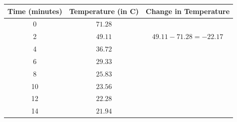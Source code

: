 \documentclass[convert]{standalone}
\begin{document}
\begin{tabular}{|c|c|c|}
	\hline
	Time (minutes) & Temperature (in \textdegree C) & Change in Temperature    \\ \hline
	0              & $71.28$                                         & \cellcolor[HTML]{C0C0C0} \\ \hline
	2              & $49.11$                                         & $49.11-71.28=-22.17$                    \\ \hline
	4              & $36.72$                                          &                          \\ \hline
	6              & $29.33$                                          &                          \\ \hline
	8              & $25.83$                                          &                          \\ \hline
	10             & $23.56$                                          &                          \\ \hline
	12             & $22.28$                                          &                          \\ \hline
	14             & $21.94$                                          & \multicolumn{1}{l|}{}    \\ \hline
\end{tabular}
\end{document}
